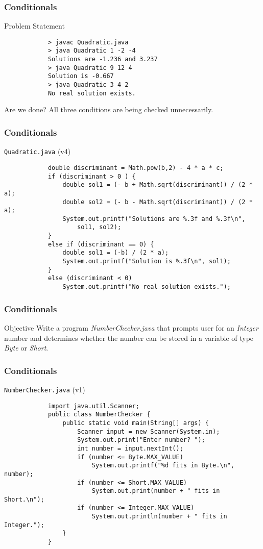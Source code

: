 \documentclass[10pt, compress]{beamer}
\begin{document}
\begin{frame}[fragile]
	\frametitle{Conditionals}
	\begin{block}{Problem Statement}
		\begin{verbatim}
			> javac Quadratic.java
			> java Quadratic 1 -2 -4
			Solutions are -1.236 and 3.237
			> java Quadratic 9 12 4
			Solution is -0.667
			> java Quadratic 3 4 2
			No real solution exists.
		\end{verbatim}
	\end{block}
	\begin{block}{Are we done?}
		All three conditions are being checked unnecessarily.
	\end{block}
\end{frame}

\begin{frame}[fragile]
	\frametitle{Conditionals}
	\begin{block}{\texttt{Quadratic.java} (v4)}
		\begin{verbatim}
			double discriminant = Math.pow(b,2) - 4 * a * c;
			if (discriminant > 0 ) {
			    double sol1 = (- b + Math.sqrt(discriminant)) / (2 * a);
			    double sol2 = (- b - Math.sqrt(discriminant)) / (2 * a);
			    System.out.printf("Solutions are %.3f and %.3f\n",
			        sol1, sol2);
			}
			else if (discriminant == 0) {
			    double sol1 = (-b) / (2 * a);
			    System.out.printf("Solution is %.3f\n", sol1);
			}
			else (discriminant < 0)
			    System.out.printf("No real solution exists.");
		\end{verbatim}
	\end{block}
\end{frame}

\begin{frame}[fragile]
	\frametitle{Conditionals}
	\begin{block}{Objective}
		Write a program \textit{NumberChecker.java} that prompts user for an \textit{Integer} number and determines whether the number can be stored in a variable of type \textit{Byte} or \textit{Short}.
	\end{block}
\end{frame}

\begin{frame}[fragile]
	\frametitle{Conditionals}
	\begin{block}{\texttt{NumberChecker.java} (v1)}
		\begin{verbatim}
			import java.util.Scanner;
			public class NumberChecker {
			    public static void main(String[] args) {
			        Scanner input = new Scanner(System.in);
			        System.out.print("Enter number? ");
			        int number = input.nextInt();
			        if (number <= Byte.MAX_VALUE)
			            System.out.printf("%d fits in Byte.\n", number);
			        if (number <= Short.MAX_VALUE)
			            System.out.print(number + " fits in Short.\n");
			        if (number <= Integer.MAX_VALUE)
			            System.out.println(number + " fits in Integer.");
			    }
			}
		\end{verbatim}
	\end{block}
\end{frame}
\end{document}
